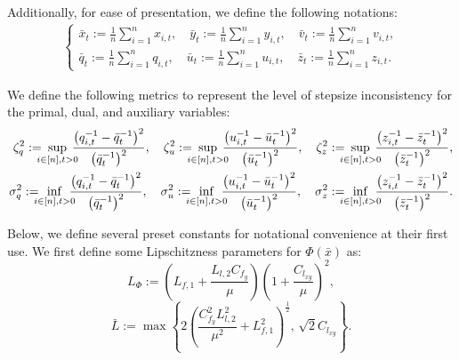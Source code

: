 \documentclass{article}
\theoremstyle{plain}
\theoremstyle{definition}
\theoremstyle{remark}
\begin{document}
Additionally, for ease of presentation, we define the following notations:
\begin{equation}\label{eqnewlemmaproof1}
\begin{aligned}
\!\!\!\!\!\begin{cases}
\bar{x}_t := \frac{1}{n} \sum_{i=1}^n x_{i,t},\quad \bar{y}_t := \frac{1}{n} \sum_{i=1}^n y_{i,t}, \quad \bar{v}_t := \frac{1}{n} \sum_{i=1}^n v_{i,t},\\
\bar{q}_t := \frac{1}{n} \sum_{i=1}^n q_{i,t},\quad \bar{u}_t := \frac{1}{n} \sum_{i=1}^n u_{i,t}, \quad \bar{z}_t := \frac{1}{n} \sum_{i=1}^n z_{i,t}.
\end{cases}
\end{aligned}
\end{equation}

We define the following metrics to represent the level of stepsize inconsistency for the primal, dual, and auxiliary variables:
\begin{align}
\zeta_q^2 := \!\!\!\!\sup_{i \in [n], t > 0} \!\!\!\!
\frac{\big(q_{i,t}^{-1} - \bar{q}_t^{-1}\big)^2}{\big(\bar{q}_t^{-1}\big)^2},\quad
\zeta_u^2 := \!\!\!\!\sup_{i \in [n], t > 0} \!\!\!\!
\frac{\big(u_{i,t}^{-1} - \bar{u}_t^{-1}\big)^2}{\big(\bar{u}_t^{-1}\big)^2},\quad
\zeta_z^2 := \!\!\!\!\sup_{i \in [n], t > 0} \!\!\!\!
\frac{\big(z_{i,t}^{-1} - \bar{z}_t^{-1}\big)^2}{\big(\bar{z}_t^{-1}\big)^2},\notag\\
\sigma_q^2 := \!\!\!\!\inf_{i \in [n], t > 0} \!\!\!\!
\frac{\big(q_{i,t}^{-1} - \bar{q}_t^{-1}\big)^2}{\big(\bar{q}_t^{-1}\big)^2},\quad
\sigma_u^2 := \!\!\!\!\inf_{i \in [n], t > 0} \!\!\!\!
\frac{\big(u_{i,t}^{-1} - \bar{u}_t^{-1}\big)^2}{\big(\bar{u}_t^{-1}\big)^2},\quad
\sigma_z^2 := \!\!\!\!\inf_{i \in [n], t > 0} \!\!\!\!
\frac{\big(z_{i,t}^{-1} - \bar{z}_t^{-1}\big)^2}{\big(\bar{z}_t^{-1}\big)^2}.\label{eq20}
\end{align}

Below, we define several preset constants for notational convenience at their first use. We first define some Lipschitzness parameters for \(\Phi(\bar{x})\) as:
\begin{equation}
  L_\Phi := \left( L_{f,1} + \frac{L_{l,2} C_{f_y}}{\mu} \right) \left( 1 + \frac{C_{l_{xy}}}{\mu} \right)^2,  \label{eq50}
\end{equation}
\begin{equation}
    \bar{L} := \max \left\{ 2 \left( \frac{C_{f_y}^2 L_{l,2}^2}{\mu^2} + L_{f,1}^2 \right)^{\frac{1}{2}}, \, \sqrt{2} C_{l_{xy}} \right\}.\label{eq51}
\end{equation}
\end{document}
